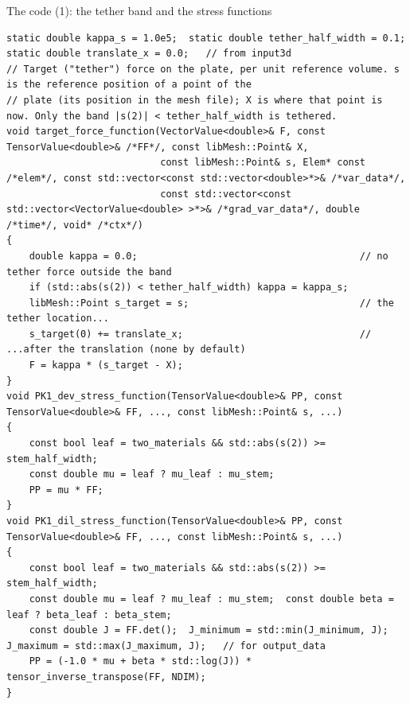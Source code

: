 \documentclass[aspectratio=169,11pt]{beamer}
\begin{document}
\begin{frame}[fragile]{The code (1): the tether band and the stress functions}
\label{fr:code1}
\begin{lstlisting}[style=cpptiny]
static double kappa_s = 1.0e5;  static double tether_half_width = 0.1;  static double translate_x = 0.0;   // from input3d
// Target ("tether") force on the plate, per unit reference volume. s is the reference position of a point of the
// plate (its position in the mesh file); X is where that point is now. Only the band |s(2)| < tether_half_width is tethered.
void target_force_function(VectorValue<double>& F, const TensorValue<double>& /*FF*/, const libMesh::Point& X,
                           const libMesh::Point& s, Elem* const /*elem*/, const std::vector<const std::vector<double>*>& /*var_data*/,
                           const std::vector<const std::vector<VectorValue<double> >*>& /*grad_var_data*/, double /*time*/, void* /*ctx*/)
{
    double kappa = 0.0;                                       // no tether force outside the band
    if (std::abs(s(2)) < tether_half_width) kappa = kappa_s;
    libMesh::Point s_target = s;                              // the tether location...
    s_target(0) += translate_x;                               // ...after the translation (none by default)
    F = kappa * (s_target - X);
}
void PK1_dev_stress_function(TensorValue<double>& PP, const TensorValue<double>& FF, ..., const libMesh::Point& s, ...)
{
    const bool leaf = two_materials && std::abs(s(2)) >= stem_half_width;
    const double mu = leaf ? mu_leaf : mu_stem;
    PP = mu * FF;
}
void PK1_dil_stress_function(TensorValue<double>& PP, const TensorValue<double>& FF, ..., const libMesh::Point& s, ...)
{
    const bool leaf = two_materials && std::abs(s(2)) >= stem_half_width;
    const double mu = leaf ? mu_leaf : mu_stem;  const double beta = leaf ? beta_leaf : beta_stem;
    const double J = FF.det();  J_minimum = std::min(J_minimum, J);  J_maximum = std::max(J_maximum, J);   // for output_data
    PP = (-1.0 * mu + beta * std::log(J)) * tensor_inverse_transpose(FF, NDIM);
}
\end{lstlisting}
\end{frame}
\end{document}
